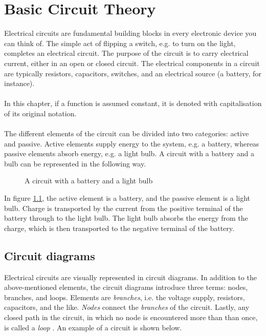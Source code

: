 \chapter{Basic Circuit Theory}
Electrical circuits are fundamental building blocks in every electronic device you can think of. The simple act of flipping a switch, e.g. to turn on the light, completes an electrical circuit. The purpose of the circuit is to carry electrical current, either in an open or closed circuit. The electrical components in a circuit are typically resistors, capacitors,  switches, and an electrical 	source (a battery, for instance).
\\ 
\\
In this chapter, if a function is assumed constant, it is denoted with capitalisation of its original notation. 
\\ 
\\
The different elements of the circuit can be divided into two categories: active and passive. Active elements supply energy to the system, e.g. a battery, whereas passive elements absorb energy, e.g. a light bulb. A circuit with a battery and a bulb can be represented in the following way.
\begin{figure}[H]

\caption{A circuit with a battery and a light bulb}
\label{fig:bulb}
\end{figure} 
\noindent In figure \ref{fig:bulb}, the active element is a battery, and the passive element is a light bulb. Charge is transported by the current from the positive terminal of the battery through to the light bulb. The light bulb absorbs the energy from the charge, which is then transported to the negative terminal of the battery.
\\



\section{Circuit diagrams}
Electrical circuits are visually represented in circuit diagrams. In addition to the above-mentioned elements, the circuit diagrams introduce three terms: nodes, branches, and loops. Elements are \textit{branches}, i.e.  the voltage supply, resistors, capacitors, and the like. \textit{Nodes} connect the \textit{branches} of the circuit. Lastly, any closed path in the circuit, in which no node is encountered more than than once, is called a \textit{loop} \cite[page~32]{bcircuit}. An example of a circuit is shown below.

